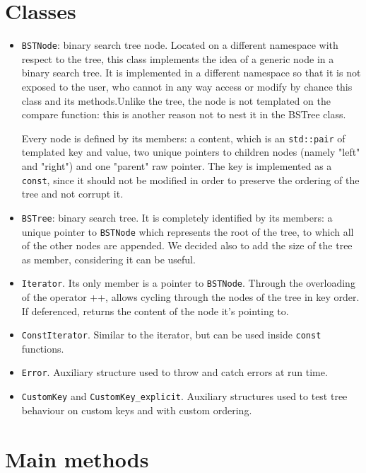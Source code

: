\documentclass[12pt,a4paper,openany]{scrartcl}
\begin{document}
\section{Classes}
	\begin{itemize}
	    \item\texttt{BSTNode}: binary search tree node. Located on a different namespace with respect to the tree, this class implements the idea of a generic node in a binary search tree. It is implemented in a different namespace so that it is not exposed to the user, who cannot in any way access or modify by chance this class and its methods.Unlike the tree, the node is not templated on the compare function: this is another reason not to nest it in the BSTree class.
	    
	    Every node is defined by its members: a content, which is an \texttt{std::pair} of templated key and value, two unique pointers to children nodes (namely "left" and "right") and one "parent" raw pointer. The key is implemented as a \texttt{const}, since it should not be modified in order to preserve the ordering of the tree and not corrupt it.
	    
	    \item \texttt{BSTree}: binary search tree. It is completely identified by its members: a unique pointer to \texttt{BSTNode} which represents the root of the tree, to which all of the other nodes are appended. We decided also to add the size of the tree as member, considering it can be useful.
	    
	    \item \texttt{Iterator}. Its only member is a pointer to \texttt{BSTNode}. Through the overloading of the operator ++, allows cycling through the nodes of the tree in key order. If deferenced, returns the content of the node it's pointing to.
	    
	    \item \texttt{ConstIterator}. Similar to the iterator, but can be used inside \texttt{const} functions.
	    
	    \item \texttt{Error}. Auxiliary structure used to throw and catch errors at run time.
	    
	    \item \texttt{CustomKey} and \texttt{CustomKey\_explicit}. Auxiliary structures used to test tree behaviour on custom keys and with custom ordering.
	\end{itemize}
	

\section{Main methods}
\end{document}
